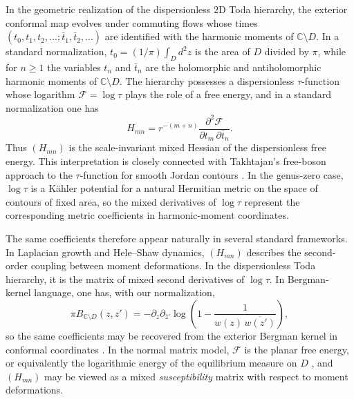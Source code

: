 \documentclass[11pt]{amsart}
\numberwithin{equation}{section}
\theoremstyle{plain}
\theoremstyle{definition}
\theoremstyle{remark}
\newcommand{\CC}{\mathbb{C}}
\begin{document}
In the geometric realization of the dispersionless \(2\)D Toda hierarchy,
the exterior conformal map evolves under commuting flows whose times
\((t_0,t_1,t_2,\dots;\bar t_1,\bar t_2,\dots)\) are
identified with the harmonic moments of \(\CC\setminus D\). In a standard normalization, \(t_0=(1/\pi)\int_D d^2z\) is the area of \(D\)
divided by \(\pi\), while for \(n\ge1\) the variables \(t_n\) and \(\bar t_n\)
are the holomorphic and antiholomorphic harmonic moments of
\(\CC\setminus D\). The hierarchy
possesses a dispersionless \(\tau\)-function whose logarithm
\(\mathcal F=\log\tau\) plays the role of a free energy, and in a standard
normalization one has
\[
	H_{mn}
	=
	r^{-(m+n)}\frac{\partial^2\mathcal F}{\partial t_m\,\partial\bar t_n}.
\]
Thus \((H_{mn})\) is the scale-invariant mixed Hessian of the dispersionless
free energy. This interpretation is closely connected with Takhtajan's
free-boson approach to the \(\tau\)-function for smooth Jordan contours
\cite{Takhtajan2001}. In the genus-zero case, \(\log\tau\) is a K\"ahler
potential for a natural Hermitian metric on the space of contours of fixed
area, so the mixed derivatives of \(\log\tau\) represent the corresponding
metric coefficients in harmonic-moment coordinates.

The same coefficients therefore appear naturally in several standard
frameworks. In
Laplacian growth and Hele--Shaw dynamics, \((H_{mn})\) describes the
second-order coupling between moment deformations. In the dispersionless Toda
hierarchy, it is the matrix of mixed second derivatives of \(\log\tau\). In
Bergman-kernel language, one has, with our normalization,
\begin{equation}\label{eq:bergman-identity}
	\pi B_{\CC\setminus D}(z,z')
	=
	-\partial_z\partial_{\bar z'}
	\log\!\left(1-\frac{1}{w(z)\,\overline{w(z')}}\right),
\end{equation}
so the same coefficients may be recovered from the exterior Bergman kernel in
conformal coordinates \cite{Bell1992,Jeong2007}. In the normal matrix model,
\(\mathcal F\) is the planar free energy, or equivalently the logarithmic
energy of the equilibrium measure on \(D\)
\cite{ZabrodinWiegmann2006,Teo2009}, and \((H_{mn})\) may be viewed as a
mixed \emph{susceptibility} matrix with respect to moment deformations.
\end{document}
